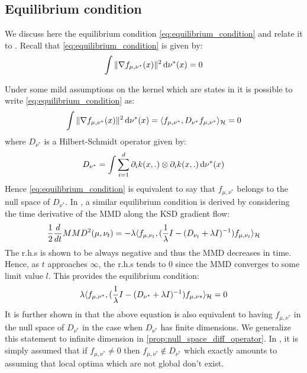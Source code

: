 \subsection{Equilibrium condition}\label{subsec:equilibrium_condition}
We discuss here the equilibrium condition \cref{eq:equilibrium_condition} and relate it to \cite[Assumption A]{Mroueh:2019}. Recall that \cref{eq:equilibrium_condition} is given by:
\[
\int \Vert \nabla f_{\mu,\nu^{*}}(x) \Vert^2 \mathop{}\!\mathrm{d} \nu^{*}(x) = 0
\]

Under some mild  assumptions on the kernel which are states in \cite[Appendix C.1]{Mroueh:2019} it is possible to write \cref{eq:equilibrium_condition} as:
\[
\int \Vert \nabla f_{\mu,\nu^{*}}(x) \Vert^2 \mathop{}\!\mathrm{d} \nu^{*}(x) = \langle f_{\mu,\nu^{*}} ,   D_{\nu^{*}}  f_{\mu,\nu^{*}}\rangle_{{{\mathcal H}}}  = 0
\]
where $D_{\nu^{*}}$ is a Hilbert-Schmidt operator given by: %
\[
D_{\nu^{*}} = \int \sum_{i=1}^d \partial_i k(x,.)\otimes \partial_i k(x,.) \mathop{}\!\mathrm{d} \nu^{*}(x)
\]
Hence \cref{eq:equilibrium_condition} is equivalent to say that $f_{\mu,\nu^{*}}$ belongs to the null space of $D_{\nu^{*}}$. In \cite[Theorem 2]{Mroueh:2019}, a similar equilibrium condition is derived by considering the time derivative of the MMD along the KSD gradient flow:
\[
\frac{1}{2} \frac{d}{dt} MMD^2(\mu,\nu_t) = - \lambda \langle f_{\mu,\nu_t}, (\frac{1}{\lambda}I - (D_{\nu_t} +\lambda I )^{-1})f_{\mu,\nu_t} \rangle_{{{\mathcal H}}} 
\] 
The r.h.s is shown to be always negative and thus the MMD decreases in time. Hence, as $t$ approaches $\infty$, the r.h.s tends to $0$ since the MMD converges to some limit value $l$. This provides the equilibrium condition:
\[
\lambda \langle f_{\mu,\nu^{*}}, (\frac{1}{\lambda}I - (D_{\nu^{*}} +\lambda I )^{-1})f_{\mu,\nu{*}} \rangle_{{{\mathcal H}}} = 0
\] 
It is further shown in  \cite[Lemma 2]{Mroueh:2019} that the above equation is also equivalent to having $f_{\mu,\nu^{*}}$ in the null space of $D_{\nu^{*}}$ in the case when $D_{\nu^{*}}$ has finite dimensions. We generalize this statement to infinite dimension in \cref{prop:null_space_diff_operator}. 
In \cite[Assumption A]{Mroueh:2019}, it is simply assumed that if $f_{\mu,\nu^{*}} \neq0$ then  $f_{\mu,\nu^{*}}\notin D_{\nu^{*}}$ which exactly amounts to assuming that local optima which are not global don't exist.
 
